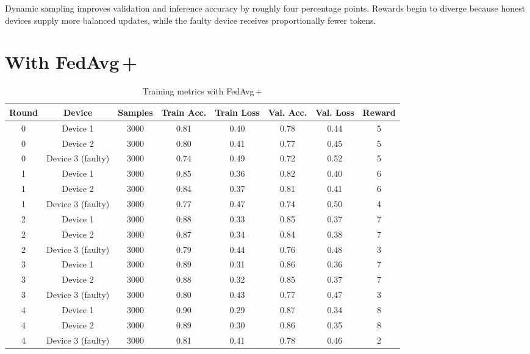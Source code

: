 Dynamic sampling improves validation and inference accuracy by roughly four percentage points. Rewards begin to diverge because honest devices supply more balanced updates, while the faulty device receives proportionally fewer tokens.

\section{With FedAvg\,+ }

\begin{table}[h!]
    \centering
    \caption{Training metrics with FedAvg\,+}
    \label{tab:fedavg_plus}
    \begin{tabular}{c c c c c c c c}
        \toprule
        \textbf{Round} & \textbf{Device} & \textbf{Samples} & \textbf{Train Acc.} & \textbf{Train Loss} & \textbf{Val. Acc.} & \textbf{Val. Loss} & \textbf{Reward} \\
        \midrule
        0 & Device 1 & 3000 & 0.81 & 0.40 & 0.78 & 0.44 & 5 \\
        0 & Device 2 & 3000 & 0.80 & 0.41 & 0.77 & 0.45 & 5 \\
        0 & Device 3 (faulty) & 3000 & 0.74 & 0.49 & 0.72 & 0.52 & 5 \\
        1 & Device 1 & 3000 & 0.85 & 0.36 & 0.82 & 0.40 & 6 \\
        1 & Device 2 & 3000 & 0.84 & 0.37 & 0.81 & 0.41 & 6 \\
        1 & Device 3 (faulty) & 3000 & 0.77 & 0.47 & 0.74 & 0.50 & 4 \\
        2 & Device 1 & 3000 & 0.88 & 0.33 & 0.85 & 0.37 & 7 \\
        2 & Device 2 & 3000 & 0.87 & 0.34 & 0.84 & 0.38 & 7 \\
        2 & Device 3 (faulty) & 3000 & 0.79 & 0.44 & 0.76 & 0.48 & 3 \\
        3 & Device 1 & 3000 & 0.89 & 0.31 & 0.86 & 0.36 & 7 \\
        3 & Device 2 & 3000 & 0.88 & 0.32 & 0.85 & 0.37 & 7 \\
        3 & Device 3 (faulty) & 3000 & 0.80 & 0.43 & 0.77 & 0.47 & 3 \\
        4 & Device 1 & 3000 & 0.90 & 0.29 & 0.87 & 0.34 & 8 \\
        4 & Device 2 & 3000 & 0.89 & 0.30 & 0.86 & 0.35 & 8 \\
        4 & Device 3 (faulty) & 3000 & 0.81 & 0.41 & 0.78 & 0.46 & 2 \\
        \bottomrule
    \end{tabular}
\end{table}

